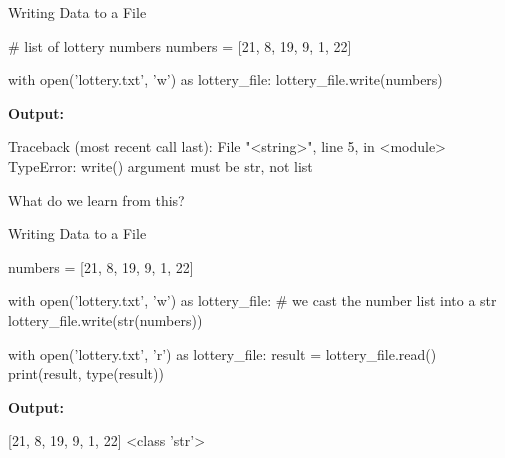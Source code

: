 \documentclass[
  american,
  ignorenonframetext,
]{beamer}
\newenvironment{pyexec}[1]{\noindent \textbf{Output: }  #1}{}
\begin{document}
\begin{frame}{Writing Data to a File}
\protect\hypertarget{writing-data-to-a-file}{}

\begin{pythoncode}

# list of lottery numbers
numbers = [21, 8, 19, 9, 1, 22]

with open('lottery.txt', 'w') as lottery_file:
    lottery_file.write(numbers)

\end{pythoncode}

\begin{pyexec}

\begin{outputcode}

Traceback (most recent call last):
  File "<string>", line 5, in <module>
TypeError: write() argument must be str, not list

\end{outputcode}

\end{pyexec}

What do we learn from this?


\end{frame}

\begin{frame}{Writing Data to a File}
\protect\hypertarget{writing-data-to-a-file-1}{}

\begin{pythoncode}

numbers = [21, 8, 19, 9, 1, 22]

with open('lottery.txt', 'w') as lottery_file:
    # we cast the number list into a str
    lottery_file.write(str(numbers))

with open('lottery.txt', 'r') as lottery_file:
    result = lottery_file.read()
    print(result, type(result))

\end{pythoncode}

\begin{pyexec}

\begin{outputcode}

[21, 8, 19, 9, 1, 22] <class 'str'>

\end{outputcode}

\end{pyexec}


\end{frame}
\end{document}
